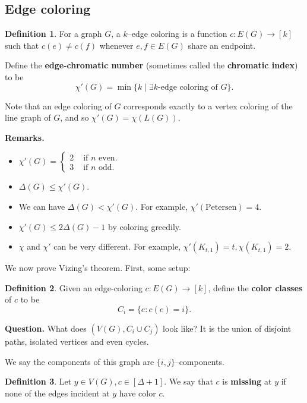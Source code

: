 \documentclass{article}
\theoremstyle{definition}
\newtheorem{defn}{Definition}[section]
\begin{document}

\subsection{Edge coloring}
\begin{defn}
    For a graph $G$, a $k$--edge coloring is a function $c : E(G) \to [k]$ such that $c(e)\neq c(f)$ whenever $e,f \in E(G)$ share an endpoint.

    Define the \textbf{edge-chromatic number} (sometimes called the \textbf{chromatic index}) to be $$\chi'(G) = \min\{k \mid \exists k\text{-edge coloring of }G\}.$$
\end{defn}
Note that an edge coloring of $G$ corresponds exactly to a vertex coloring of the line graph of $G$, and so $\chi'(G)=\chi(L(G))$.
\vspace{1mm}

\textbf{Remarks.} \begin{itemize}
    \item $\chi'(G) = \begin{cases}
        2 &\text{ if } n \text{ even.} \\
        3 &\text{ if } n \text{ odd.}
    \end{cases}$
    \item $\Delta(G) \le \chi'(G)$.
    \item We can have $\Delta(G) < \chi'(G)$. For example, $\chi'(\text{Petersen})=4$.
    \item $\chi'(G)\le 2 \Delta(G)-1$ by coloring greedily.
    \item $\chi$ and $\chi'$ can be very different. For example, $\chi'(K_{t,1})=t, \chi(K_{t,1})=2$.
\end{itemize}

We now prove Vizing's theorem. First, some setup:
\begin{defn}
    Given an edge-coloring $c : E(G) \to [k]$, define the \textbf{color classes} of $c$ to be \[
    C_i = \{e : c(e)=i\}.
    \]
\end{defn}
\textbf{Question.} What does $(V(G), C_i \cup C_j)$ look like? It is the union of disjoint paths, isolated vertices and even cycles.

We say the components of this graph are $\{i,j\}$--components.

\begin{defn}
    Let $y \in V(G), c \in [\Delta+1]$. We say that $c$ is \textbf{missing} at $y$ if none of the edges incident at $y$ have color $c$. 
\end{defn}
\end{document}
